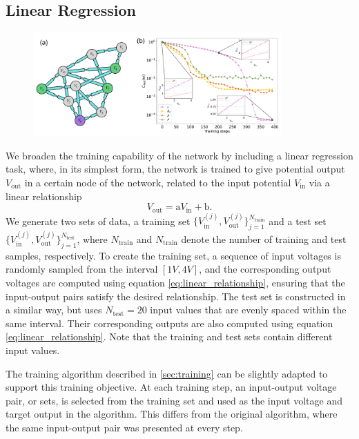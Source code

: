 \documentclass[reprint,superscriptaddress,prb,showkeys]{revtex4-2}
\begin{document}
\subsection{\label{sec:linear_regression}Linear Regression}
\begin{figure}[t]
    \centering
    \includegraphics[width=0.85\textwidth]{plots/regression/regression_G00010001.pdf}
    \caption{}\label{fig:lin_regr1}
\end{figure}

We broaden the training capability of the network by including a linear regression task, where, in its simplest form, the network is trained to give potential output $V_{\text{out}}$ in a certain node of the network, related to the input potential $V_{\text{in}}$ via a linear relationship
\begin{equation}
    V_{\text{out}} = \text{a} V_{\text{in}} + \text{b}.
\label{eq:linear_relationship}
\end{equation}
We generate two sets of data, a training set $ \{ V_{\text{in}}^{(j)}, V_{\text{out}}^{(j)} \}_{j=1}^{N_{\text{train}}}$ and a test set $ \{ V_{\text{in}}^{(j)}, V_{\text{out}}^{(j)} \}_{j=1}^{N_{\text{test}}}$, where $N_{\text{train}}$ and $N_{\text{train}}$ denote the number of training and test samples, respectively. To create the training set, a sequence of input voltages is randomly sampled from the interval $[1V, 4V]$, and the corresponding output voltages are computed using equation \cref{eq:linear_relationship}, ensuring that the input-output pairs satisfy the desired relationship.
The test set is constructed in a similar way, but uses $N_{\text{test}}=20$ input values that are evenly spaced within the same interval. Their corresponding outputs are also computed using equation \cref{eq:linear_relationship}. Note that the training and test sets contain different input values.

The training algorithm described in \cref{sec:training} can be slightly adapted to support this training objective. At each training step, an input-output voltage pair, or sets, is selected from the training set and used as the input voltage and target output in the algorithm. This differs from the original algorithm, where the same input-output pair was presented at every step.
\end{document}
